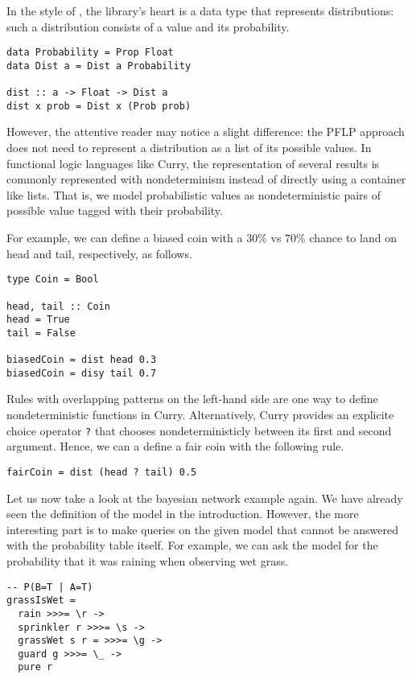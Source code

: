 \documentclass[
12pt, %
a4paper, %
oneside, %
]{llncs}
\newcommand{\code}[1]{{\texttt{#1}}}
\begin{document}
In the style of \cite{pfp}, the library's heart is a data type that
represents distributions: such a distribution consists of a value and
its probability. %

\begin{verbatim}
data Probability = Prop Float
data Dist a = Dist a Probability

dist :: a -> Float -> Dist a
dist x prob = Dist x (Prob prob)
\end{verbatim}

However, the attentive reader may notice a slight difference: the PFLP
approach does not need to represent a distribution as a list of its
possible values. %
In functional logic languages like Curry, the representation of
several results is commonly represented with nondeterminism instead of
directly using a container like lists. %
That is, we model probabilistic values as nondeterministic pairs of
possible value tagged with their probability. %

For example, we can define a biased coin with a $30\%$ vs $70\%$
chance to land on head and tail, respectively, as follows. %

\begin{verbatim}
type Coin = Bool

head, tail :: Coin
head = True
tail = False

biasedCoin = dist head 0.3
biasedCoin = disy tail 0.7
\end{verbatim}

Rules with overlapping patterns on the left-hand side are one way to
define nondeterministic functions in Curry. %
Alternatively, Curry provides an explicite choice operator \code{?}
that chooses nondeterministicly between its first and second
argument. %
Hence, we can a define a fair coin with the following rule. %

\begin{verbatim}
fairCoin = dist (head ? tail) 0.5
\end{verbatim}

Let us now take a look at the bayesian network example again. %
We have already seen the definition of the model in the
introduction. %
However, the more interesting part is to make queries on the given
model that cannot be answered with the probability table itself. %
For example, we can ask the model for the probability that it was
raining when observing wet grass. %

\begin{verbatim}
-- P(B=T | A=T)
grassIsWet =
  rain >>>= \r ->
  sprinkler r >>>= \s ->
  grassWet s r = >>>= \g ->
  guard g >>>= \_ ->
  pure r
\end{verbatim}
\end{document}

